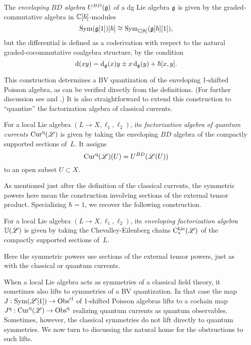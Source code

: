 \documentclass[10pt]{amsart}
\def\Cur{{\rm Cur}}
\begin{document}
\begin{dfn}
\label{def: BD envelope}
The {\em enveloping $BD$ algebra} $U^{BD}(\mathfrak g)$ of a dg Lie algebra $\mathfrak g$ is given by the graded-commutative algebra in $\mathbb C[\hbar]$-modules
\[
{\rm Sym}(\mathfrak g[1])[\hbar] \cong {\rm Sym}_{\mathbb C[\hbar]}(\mathfrak g[\hbar][1]),
\]
but the differential is defined as a coderivation with respect to the natural graded-cocommutative coalgebra structure,
by the condition
\[
{\rm d}(xy) = {\rm d}_\mathfrak g(x)y \pm x\, {\rm d}_\mathfrak g(y) + \hbar [x,y].
\]
\end{dfn}

This construction determines a BV quantization of the enveloping 1-shifted Poisson algebra,
as can be verified directly from the definitions.
(For further discussion see \cite{GH} and \cite{CG2}.)
It is also straightforward to extend this construction to ``quantize'' the factorization algebra of classical currents.

\begin{dfn}
For a local Lie algebra $(L\to X, \ell_1,\ell_2)$, 
its {\em factorization algebra of quantum currents} $\Cur^\q(\sL)$ is given by taking the enveloping $BD$   algebra of the compactly supported sections of~$L$.
It assigns
\[
\Cur^\q(\sL)(U) = U^{BD}(\sL(U))
\]
to an open subset $U \subset X$.
\end{dfn}

As mentioned just after the definition of the classical currents, 
the symmetric powers here mean the construction involving sections of the external tensor product.
Specializing $\hbar = 1$, we recover the following construction.

\begin{dfn}
For a local Lie algebra $(L\to X, \ell_1,\ell_2)$, 
its {\em enveloping factorization algebra} $\mathbb U(\mathscr L)$ is given by taking the Chevalley-Eilenberg chains ${\rm C}^{\rm Lie}_*(\mathscr L)$ of the compactly supported sections of~$L$.
\end{dfn}

Here the symmetric powers use sections of the external tensor powers, just as with the classical or quantum currents.

When a local Lie algebra acts as symmetries of a classical field theory,
it sometimes also lifts to symmetries of a BV quantization.
In that case the map $J: {\rm Sym}(\mathscr L[1]) \to {\rm Obs}^{\rm cl}$ of 1-shifted Poisson algebras lifts to a cochain map $J^\q: \Cur^\q(\sL) \to \Obs^\q$ realizing quantum currents as quantum observables.
Sometimes, however, the classical symmetries do not lift directly to quantum symmetries.
We now turn to discussing the natural home for the obstructions to such lifts.
\end{document}
